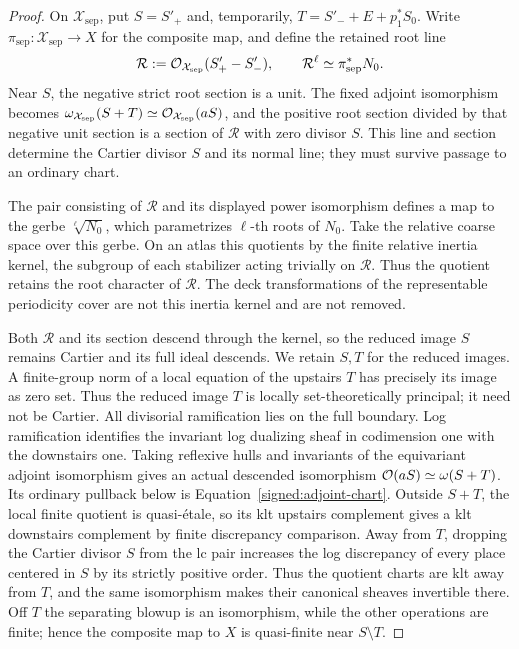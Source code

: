 \begin{proof}
On \(\mathcal X_{\mathrm{sep}}\), put \(S=S'_+\) and, temporarily,
\(T=S'_-+E+p_1^*S_0\).  Write
\(\pi_{\mathrm{sep}}:\mathcal X_{\mathrm{sep}}\to X\) for the composite
map, and define the retained root line
\[
 \mathcal R:=\mathcal O_{\mathcal X_{\mathrm{sep}}}(S'_+-S'_-),
 \qquad \mathcal R^\ell\simeq\pi_{\mathrm{sep}}^*N_0.
\]
Near \(S\), the negative strict root section is a unit.  The fixed adjoint
isomorphism becomes
\(\omega_{\mathcal X_{\mathrm{sep}}}(S+T)
  \simeq\mathcal O_{\mathcal X_{\mathrm{sep}}}(aS)\), and the positive root
section divided by that negative unit section is a section of
\(\mathcal R\) with zero divisor \(S\).  This line and section determine
the Cartier divisor \(S\) and its normal line; they must survive passage
to an ordinary chart.

The pair consisting of \(\mathcal R\) and its displayed power isomorphism
defines a map to the gerbe \(\sqrt[\ell]{N_0}\), which parametrizes
\(\ell\)-th roots of \(N_0\).  Take the relative coarse space over this
gerbe.  On an atlas this quotients by the finite relative inertia kernel,
the subgroup of each stabilizer acting trivially on \(\mathcal R\).
Thus the quotient retains the root character of \(\mathcal R\).  The
deck transformations of the representable periodicity cover
are not this inertia kernel and are not removed.

Both \(\mathcal R\) and its section descend through the kernel, so the
reduced image \(S\) remains Cartier and its full ideal descends.  We retain
\(S,T\) for the reduced images.  A finite-group norm of
a local equation of the upstairs \(T\) has precisely its image
as zero set.  Thus the reduced image \(T\) is locally
set-theoretically principal; it need not be Cartier.  All
divisorial ramification lies on the full boundary.  Log
ramification identifies the invariant log dualizing sheaf in
codimension one with the downstairs one.  Taking reflexive
hulls and invariants of the equivariant adjoint isomorphism
gives an actual descended isomorphism \(\mathcal O(aS)\simeq\omega(S+T)\).
Its ordinary pullback below is Equation~\eqref{signed:adjoint-chart}.
Outside \(S+T\), the local
finite quotient is quasi-étale, so its klt upstairs complement gives
a klt downstairs complement by finite discrepancy comparison.  Away from
\(T\), dropping the Cartier divisor \(S\) from the lc pair
increases the log discrepancy of every place centered in \(S\) by
its strictly positive order.  Thus the quotient charts are klt away from
\(T\), and the same isomorphism makes their canonical sheaves invertible
there.  Off \(T\) the separating blowup is an
isomorphism, while the other operations are finite; hence
the composite map to \(X\) is quasi-finite near \(S\setminus T\).


\end{proof}
